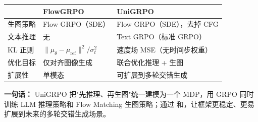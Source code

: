 \begin{center}
{\small
\begin{tabular}{p{3.5cm}p{4.5cm}p{5cm}}
\hline
 & \textbf{FlowGRPO} & \textbf{UniGRPO} \\
\hline
生图策略 & Flow GRPO（SDE） & Flow GRPO（SDE），去掉 CFG \\
文本推理 & 无 & Text GRPO（标准 GRPO） \\
KL 正则 & $\|\mu_\theta - \mu_\text{ref}\|^2 / \sigma_t^2$ & 速度场 MSE（无时间步权重） \\
优化目标 & 仅对齐图像生成 & 联合优化推理 + 生图 \\
扩展性 & 单模态 & 可扩展到多轮交错生成 \\
\hline
\end{tabular}
}
\end{center}

\begin{summarybox}
\textbf{一句话：} UniGRPO 把"先推理、再生图"统一建模为一个 MDP，用 GRPO 同时训练 LLM 推理策略和 Flow Matching 生图策略；通过 和，让框架更稳定、更易扩展到未来的多轮交错生成场景。
\end{summarybox}

